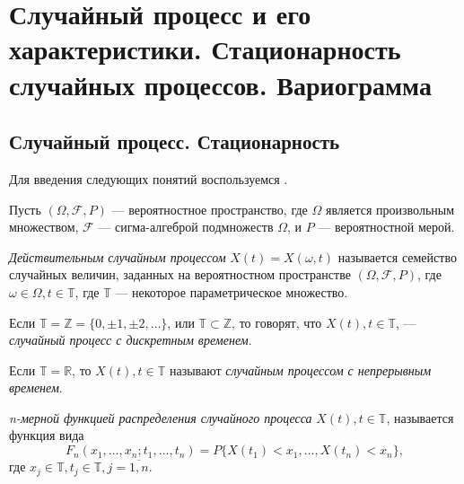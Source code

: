 \newpage
\chapter{Случайный процесс и его характеристики. Стационарность случайных процессов. Вариограмма}
\label{c:definitions}

\section{Случайный процесс. Стационарность}

Для введения следующих понятий воспользуемся \cite{brillinjer-ts, trush-ts}.

Пусть $ (\Omega, \mathcal{F}, P) $ --- вероятностное пространство, где $\Omega$ является произвольным множеством, $\mathcal{F}$ --- сигма-алгеброй подмножеств $\Omega$, и $P$ --- вероятностной мерой.

\begin{Definition}
\label{def:stochastic-process}
	\textit{Действительным случайным процессом} $ X(t) = X(\omega, t) $ называется семейство случайных величин, заданных на вероятностном пространстве $ (\Omega, \mathcal{F}, P) $, где $ \omega \in \Omega, t \in \mathbb{T}$, где $ \mathbb{T} $ --- некоторое параметрическое множество.
\end{Definition}

\begin{Definition}
	Если $ \mathbb{T} = \mathbb{Z} = \{ 0, \pm 1, \pm 2, \dots \} $, или $ \mathbb{T} \subset \mathbb{Z} $, то говорят, что $ X(t), t \in \mathbb{T} $, --- \textit{случайный процесс с дискретным временем}.
\end{Definition}

\begin{Definition}
	Если $ \mathbb{T} = \mathbb{R} $, то $ X(t), t \in \mathbb{T} $ называют \textit{случайным процессом с непрерывным временем}.
\end{Definition}

\begin{Definition}
\label{def:distr_func}
	\textit{n-мерной функцией распределения случайного процесса} $ X(t), t \in \mathbb{T} $, называется функция вида
	\begin{equation*}
		F_n(x_1, \dots, x_n; t_1, \dots, t_n) = P \{ X(t_1) < x_1, \dots, X(t_n) < x_n \},
	\end{equation*}
	где $ x_j \in \mathbb{T}, t_j \in \mathbb{T}, j = \overline{1,n} $.
\end{Definition}

